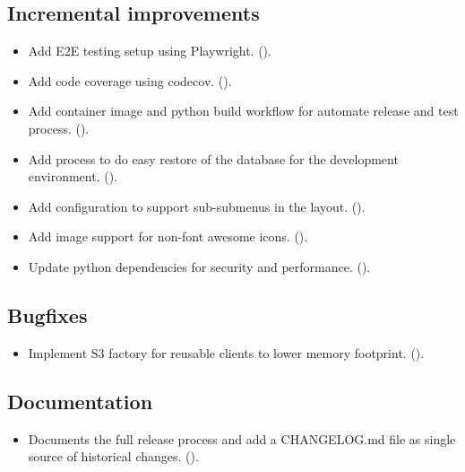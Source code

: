 \subsection*{Incremental improvements}
\begin{itemize}
\item{Add E2E testing setup using Playwright.
    ().}
\item{Add code coverage using codecov.
    ().}
\item{Add container image and python build workflow for automate release and test process.
    ().}
\item{Add process to do easy restore of the database for the development environment.
    ().}
\item{Add configuration to support sub-submenus in the layout.
    ().}
\item{Add image support for non-font awesome icons.
    ().}
\item{Update python dependencies for security and performance.
    ().}
\end{itemize}

\subsection*{Bugfixes}
\begin{itemize}
\item{Implement S3 factory for reusable clients to lower memory footprint.
    ().}
\end{itemize}

\subsection*{Documentation}
\begin{itemize}
\item{Documents the full release process and add a CHANGELOG.md file as single source of historical changes.
    ().}
\end{itemize}

